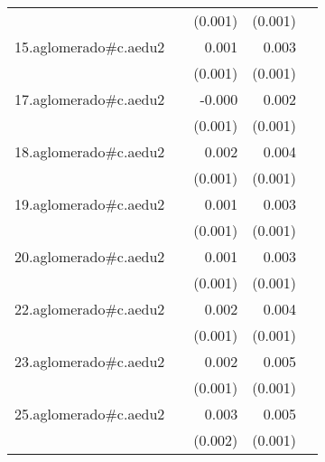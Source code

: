 {\begin{longtable}{l*{4}{D{.}{.}{-1}}}
            &                     &     (0.001)         &     (0.001)         &                     \\
\addlinespace
15.aglomerado#c.aedu2&                     &       0.001         &       0.003\sym{***}&                     \\
            &                     &     (0.001)         &     (0.001)         &                     \\
\addlinespace
17.aglomerado#c.aedu2&                     &      -0.000         &       0.002         &                     \\
            &                     &     (0.001)         &     (0.001)         &                     \\
\addlinespace
18.aglomerado#c.aedu2&                     &       0.002         &       0.004\sym{***}&                     \\
            &                     &     (0.001)         &     (0.001)         &                     \\
\addlinespace
19.aglomerado#c.aedu2&                     &       0.001         &       0.003\sym{***}&                     \\
            &                     &     (0.001)         &     (0.001)         &                     \\
\addlinespace
20.aglomerado#c.aedu2&                     &       0.001         &       0.003\sym{**} &                     \\
            &                     &     (0.001)         &     (0.001)         &                     \\
\addlinespace
22.aglomerado#c.aedu2&                     &       0.002         &       0.004\sym{***}&                     \\
            &                     &     (0.001)         &     (0.001)         &                     \\
\addlinespace
23.aglomerado#c.aedu2&                     &       0.002         &       0.005\sym{***}&                     \\
            &                     &     (0.001)         &     (0.001)         &                     \\
\addlinespace
25.aglomerado#c.aedu2&                     &       0.003         &       0.005\sym{***}&                     \\
            &                     &     (0.002)         &     (0.001)         &                     \\

\end{longtable}}
